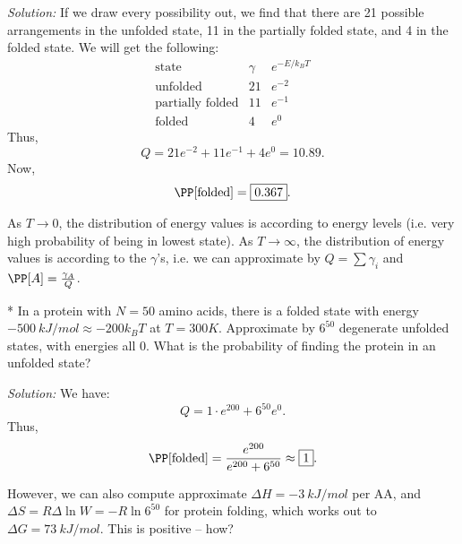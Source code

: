 \textit{Solution:}
If we draw every possibility out, we find that there are 21 possible arrangements in the unfolded state, 11 in the partially folded state, and 4 in the folded state.
We will get the following: \[
	\begin{array}{c|c|c} 
		\text{state} & \gamma & e^{-E/k_BT} \\ \hline
		\text{unfolded} & 21 & e^{-2} \\ \hline
		\text{partially folded} & 11 & e^{-1} \\ \hline
		\text{folded} & 4 & e^0
	\end{array}
\]
Thus, \[
	Q = 21e^{-2} + 11e^{-1} + 4e^0 = 10.89.
\]
Now, \[
	\PP[\text{folded}] = \boxed{0.367}.
\]

\begin{fact}
	As $T\to 0$, the distribution of energy values is according to energy levels (i.e. very high probability of being in lowest state).
	As $T \to \infty$, the distribution of energy values is according to the $\gamma$'s, i.e. we can approximate by $Q = \sum \gamma_i$ and $\PP[A] = \frac{\gamma_A}{Q}$.
\end{fact}

\begin{exm}*
	In a protein with $N = 50$ amino acids, there is a folded state with energy $\SI{-500}{kJ/mol} \approx -200k_BT$ at $T = \SI{300}K$.
	Approximate by $6^{50}$ degenerate unfolded states, with energies all $0$. What is the probability of finding the protein in an unfolded state?
\end{exm}

\textit{Solution:}
We have: \[
	Q = 1 \cdot e^{200} + 6^{50} e^0.
\]
Thus, \[
	\PP[\text{folded}] = \frac{e^{200}}{e^{200} + 6^{50}} \approx \boxed{1}.
\]

However, we can also compute approximate $\Delta H = \SI{-3}{kJ/mol}$ per AA, and $\Delta S = R\Delta \ln W = -R\ln 6^{50}$ for protein folding, which works out to $\Delta G = \SI{73}{kJ/mol}$. This is positive -- how?
